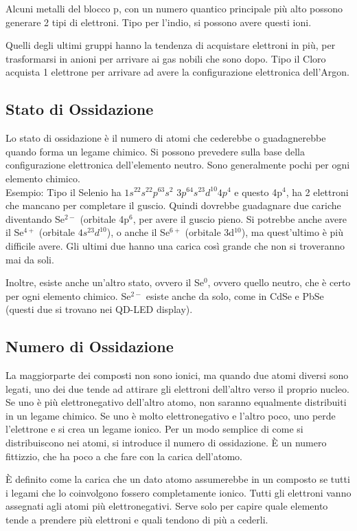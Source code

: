 \documentclass[a4paper]{article}
\begin{document}
Alcuni metalli del blocco p, con un numero quantico principale più alto possono generare 2 tipi di elettroni. Tipo per l'indio, si possono avere questi ioni. 

Quelli degli ultimi gruppi hanno la tendenza di acquistare elettroni in più, per trasformarsi in anioni per arrivare ai gas nobili che sono dopo. Tipo il Cloro acquista 1 elettrone per arrivare ad avere la configurazione elettronica dell'Argon. 

\subsection{Stato di Ossidazione}
Lo stato di ossidazione è il numero di atomi che cederebbe o guadagnerebbe quando forma un legame chimico. Si possono prevedere sulla base della configurazione elettronica dell'elemento neutro. Sono generalmente pochi per ogni elemento chimico. \\

Esempio: Tipo il Selenio  ha $1s^22s^22p^63s^2$ $3p^64s^23d^{10}4p^4$ e questo 4p$^4$, ha 2 elettroni che mancano per completare il guscio. Quindi dovrebbe guadagnare due cariche diventando Se$^{2-}$ (orbitale 4p$^6$, per avere il guscio pieno. Si potrebbe anche avere il Se$^{4+}$ (orbitale $4s^23d^{10}$), o anche il Se$^{6+}$ (orbitale 3d$^10$), ma quest'ultimo è più difficile avere. Gli ultimi due hanno una carica così grande che non si troveranno mai da soli. 

Inoltre, esiste anche un'altro stato, ovvero il Se$^0$, ovvero quello neutro, che è certo per ogni elemento chimico. Se$^{2-}$ esiste anche da solo, come in CdSe e PbSe (questi due si trovano nei QD-LED display). 

\subsection{Numero di Ossidazione}
La maggiorparte dei composti non sono ionici, ma quando due atomi diversi sono legati, uno dei due tende ad attirare gli elettroni dell'altro verso il proprio nucleo. Se uno è più elettronegativo dell'altro atomo, non saranno equalmente distribuiti in un legame chimico. Se uno è molto elettronegativo e l'altro poco, uno perde l'elettrone e si crea un legame ionico. Per un modo semplice di come si distribuiscono nei atomi, si introduce il numero di ossidazione. È un numero fittizzio, che ha poco a che fare con la carica dell'atomo. 

È definito come la carica che un dato atomo assumerebbe in un composto se tutti i legami che lo coinvolgono fossero completamente ionico. Tutti gli elettroni vanno assegnati agli atomi più elettronegativi. Serve solo per capire quale elemento tende a prendere più elettroni e quali tendono di più a cederli. 
\end{document}
